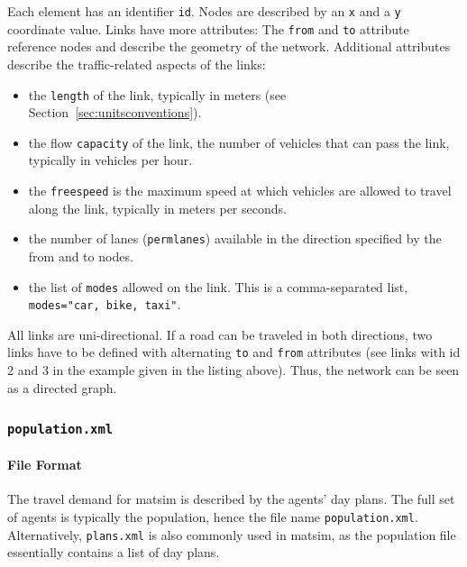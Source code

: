 Each element has an identifier \lstinline|id|. Nodes are described by an \lstinline|x| and a \lstinline|y| coordinate value. Links have more attributes: The \lstinline|from| and \lstinline|to| attribute reference nodes and describe the geometry of the network. Additional attributes describe the traffic-related aspects of the links:
\begin{itemize}\styleItemize
    \item the \lstinline|length| of the link, typically in meters (see Section~\ref{sec:unitsconventions}).
    \item the flow \lstinline|capacity| of the link, \ie the number of vehicles that can pass the link, typically in vehicles per hour.
    \item the \lstinline|freespeed| is the maximum speed at which vehicles are allowed to travel along the link, typically in meters per seconds.
    \item the number of lanes (\lstinline|permlanes|) available in the direction specified by the from and to nodes.
    \item the list of \lstinline|modes| allowed on the link. This is a comma-separated list, \eg \lstinline|modes="car, bike, taxi"|.
\end{itemize}
All links are uni-directional. If a road can be traveled in both directions, two links have to be defined with alternating \lstinline|to| and \lstinline|from| attributes (see links with id 2 and 3 in the example given in the listing above). Thus, the network can be seen as a directed graph. 

\subsubsection{\lstinline|population.xml|}
\label{sec:lgstarted-population-file}
\paragraph{File Format}

The travel demand for \gls{matsim} is described by the agents' day plans. The full set of agents is typically the population, hence the file name \lstinline|population.xml|. Alternatively, \lstinline|plans.xml| is also commonly used in \gls{matsim}, as the population file essentially contains a list of day plans.

